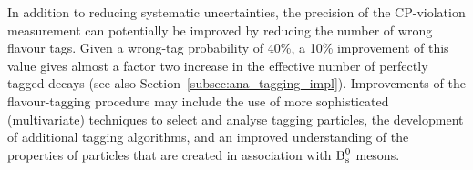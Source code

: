 In addition to reducing systematic uncertainties, the precision of the CP-violation measurement can potentially be improved by reducing the
number of wrong flavour tags. Given a wrong-tag probability of 40\%, a 10\% improvement of this value gives almost a factor two increase in
the effective number of perfectly tagged decays (see also Section~\ref{subsec:ana_tagging_impl}). Improvements of the flavour-tagging
procedure may include the use of more sophisticated (multivariate) techniques to select and analyse tagging particles, the development of
additional tagging algorithms, and an improved understanding of the properties of particles that are created in association with $\text{B}_\text{s}^\text{0}$
mesons.
